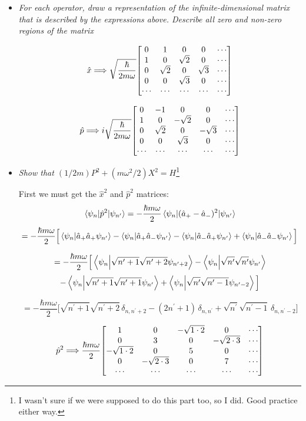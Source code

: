 \documentclass[12pt]{article}
\begin{document}
\begin{itemize}
\item \emph{For each operator, draw a representation of the infinite-dimensional matrix that is described by the expressions above. Describe all zero and non-zero regions of the matrix}

\[\hat{x} \Longrightarrow \sqrt{\frac{\hbar}{2m\omega}} \mqty[0 & 1 & 0 & 0 & \cdots \\ 1 & 0 & \sqrt{2} & 0 & \cdots \\ 0 & \sqrt{2} & 0 & \sqrt{3} & \cdots \\ 0 & 0 & \sqrt{3} & 0 & \cdots \\ \cdots & \cdots & \cdots & \cdots & \cdots]\]


\[\hat{p} \Longrightarrow i\sqrt{\frac{\hbar}{2m\omega}} \mqty[0 & -1 & 0 & 0 & \cdots \\ 1 & 0 & -\sqrt{2} & 0 & \cdots \\ 0 & \sqrt{2} & 0 & -\sqrt{3} & \cdots \\ 0 & 0 & \sqrt{3} & 0 & \cdots \\ \cdots & \cdots & \cdots & \cdots & \cdots]\]

\item \emph{Show that $(1/2m)P^2 + (m\omega^2 /2)X^2 = H$}\footnote{I wasn't sure if we were supposed to do this part too, so I did. Good practice either way.}

First we must get the $\hat{x}^2$ and $\hat{p}^2$ matrices:
\[\mel{\psi_n}{\hat{p}^2}{\psi_{n^\prime}} = -\frac{\hbar m \omega}{2}\mel{\psi_n}{(\hat{a}_+ - \hat{a}_-)^2}{\psi_{n^\prime}}\]
\[= -\frac{\hbar m \omega}{2}\Big[\braket{\psi_n}{\hat{a}_+\hat{a}_+ \psi_{n^\prime}} - \braket{\psi_n}{\hat{a}_+\hat{a}_- \psi_{n^\prime}} - \braket{\psi_n}{\hat{a}_-\hat{a}_+ \psi_{n^\prime}} + \braket{\psi_n}{\hat{a}_-\hat{a}_- \psi_{n^\prime}}\Big]\]

\[= -\frac{\hbar m \omega}{2}\Big[\braket{\psi_n}{\sqrt{n^\prime + 1}\sqrt{n^\prime + 2} \psi_{n^\prime+2}} - \braket{\psi_n}{\sqrt{n^\prime}\sqrt{n^\prime} \psi_{n^\prime}}\]
\[- \braket{\psi_n}{\sqrt{n^\prime + 1}\sqrt{n^\prime + 1} \psi_{n^\prime}} + \braket{\psi_n}{\sqrt{n^\prime}\sqrt{n^\prime -1} \psi_{n^\prime-2}}\Big]\]

\[= -\frac{\hbar m \omega}{2}\Big[
\sqrt{n^\prime + 1}\sqrt{n^\prime + 2} \, \delta_{n, n^\prime +2} 
- (2n^\prime + 1) \, \delta_{n, n^\prime} 
+ \sqrt{n^\prime}\sqrt{n^\prime -1} \, \delta_{n, n^\prime -2}\Big]\]

\[\hat{p}^2 \Longrightarrow \frac{\hbar m \omega}{2} \mqty[
1 & 0 & -\sqrt{1 \cdot 2} & 0 & \cdots \\ 
0 & 3 & 0 & -\sqrt{2 \cdot 3} & \cdots \\ 
-\sqrt{1 \cdot 2} & 0 & 5 & 0 & \cdots \\ 
0 & -\sqrt{2 \cdot 3} & 0 & 7 & \cdots \\ 
\cdots & \cdots & \cdots & \cdots & \cdots]\]


\end{itemize}
\end{document}
